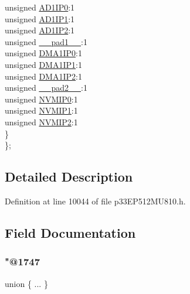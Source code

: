 \begin{DoxyCompactItemize}
\begin{tabbing}
\>\>unsigned \hyperlink{structtag_i_p_c3_b_i_t_s_a04e12bd007315600b2f50d3bc5273fe4}{AD1IP0}:1\\
\>\>unsigned \hyperlink{structtag_i_p_c3_b_i_t_s_a2054f5826235793b4909d228d906d43f}{AD1IP1}:1\\
\>\>unsigned \hyperlink{structtag_i_p_c3_b_i_t_s_a00bd137e3753d0318f71dab0658abb92}{AD1IP2}:1\\
\>\>unsigned \hyperlink{structtag_i_p_c3_b_i_t_s_acaf2d0924a107ec6e8d2e31febaf66f9}{\_\_pad1\_\_}:1\\
\>\>unsigned \hyperlink{structtag_i_p_c3_b_i_t_s_a6a7b876c1199e7f6d3179e6e1e904c96}{DMA1IP0}:1\\
\>\>unsigned \hyperlink{structtag_i_p_c3_b_i_t_s_af9a359104a98c998c47fd9fa627a96c4}{DMA1IP1}:1\\
\>\>unsigned \hyperlink{structtag_i_p_c3_b_i_t_s_aee6b86ba89f0ea1d403d078f3b4f7085}{DMA1IP2}:1\\
\>\>unsigned \hyperlink{structtag_i_p_c3_b_i_t_s_a4d97cc5f7d51d22fc2bf3eab35c9cb7f}{\_\_pad2\_\_}:1\\
\>\>unsigned \hyperlink{structtag_i_p_c3_b_i_t_s_a4657ccfe62fb665480c1168a109eda19}{NVMIP0}:1\\
\>\>unsigned \hyperlink{structtag_i_p_c3_b_i_t_s_af212ba8a79539500d5a3c3d869abb679}{NVMIP1}:1\\
\>\>unsigned \hyperlink{structtag_i_p_c3_b_i_t_s_a4def765dbdc2f16aa5ff526c9a747827}{NVMIP2}:1\\
\>\} \\
\}; \\

\end{tabbing}\end{DoxyCompactItemize}


\subsection{Detailed Description}


Definition at line 10044 of file p33\+E\+P512\+M\+U810.\+h.



\subsection{Field Documentation}
\mbox{\label{structtag_i_p_c3_b_i_t_s_a39dafb761dd0b1e3726aaad7b6eb131d}} 
\subsubsection{\texorpdfstring{"@1747}{@1747}}
{\footnotesize\ttfamily union \{ ... \} }

